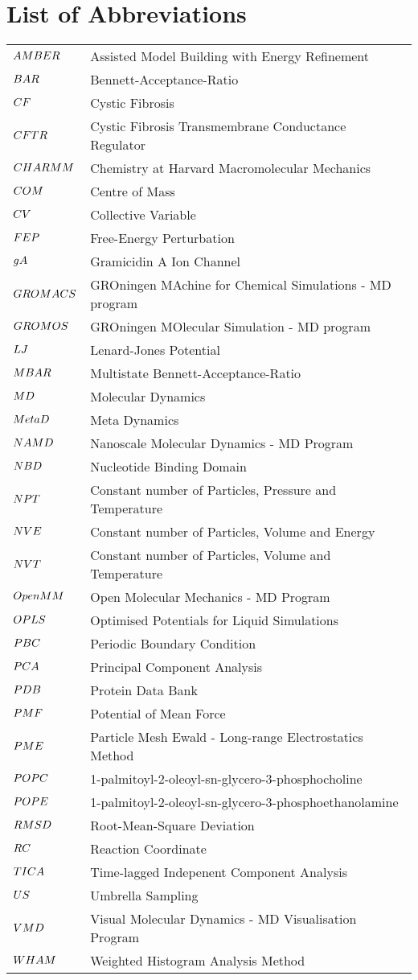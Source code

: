 \chapter*{List of Abbreviations}
\label{chap:abbrev}

\begin{center}
\begin{bfseries}
\vskip 5mm
\newcommand\nomenclature[2]{#1 & #2 \\}
\begin{longtable}{@{}p{3cm}@{}p{\dimexpr\textwidth-1cm\relax}@{}}
\nomenclature{${\small AMBER}$}    {Assisted Model Building with Energy Refinement}
\nomenclature{${\small BAR}$}      {Bennett-Acceptance-Ratio}
\nomenclature{${\small CF}$}        {Cystic Fibrosis}
\nomenclature{${\small CFTR}$}      {Cystic Fibrosis Transmembrane Conductance Regulator}
\nomenclature{${\small CHARMM}$}   {Chemistry at Harvard Macromolecular Mechanics}
\nomenclature{${\small COM}$}      {Centre of Mass}
\nomenclature{${\small CV}$}       {Collective Variable}
\nomenclature{${\small FEP}$}      {Free-Energy Perturbation}
\nomenclature{${\small gA}$}       {Gramicidin A Ion Channel}
\nomenclature{${\small GROMACS}$}  {GROningen MAchine for Chemical Simulations - MD program}
\nomenclature{${\small GROMOS}$}   {GROningen MOlecular Simulation - MD program}
\nomenclature{${\small LJ}$}       {Lenard-Jones Potential}
\nomenclature{${\small MBAR}$}     {Multistate Bennett-Acceptance-Ratio}
\nomenclature{${\small MD}$}       {Molecular Dynamics}
\nomenclature{${\small MetaD}$}    {Meta Dynamics}
\nomenclature{${\small NAMD}$}     {Nanoscale Molecular Dynamics - MD Program}
\nomenclature{${\small NBD}$}     {Nucleotide Binding Domain}
\nomenclature{${\small NPT}$}      {Constant number of Particles, Pressure and Temperature}
\nomenclature{${\small NVE}$}      {Constant number of Particles, Volume and Energy}
\nomenclature{${\small NVT}$}      {Constant number of Particles, Volume and Temperature}
\nomenclature{${\small OpenMM}$}   {Open Molecular Mechanics - MD Program}
\nomenclature{${\small OPLS}$}     {Optimised Potentials for Liquid Simulations}
\nomenclature{${\small PBC}$}      {Periodic Boundary Condition}
\nomenclature{${\small PCA}$}      {Principal Component Analysis}
\nomenclature{${\small PDB}$}      {Protein Data Bank}
\nomenclature{${\small PMF}$}      {Potential of Mean Force}
\nomenclature{${\small PME}$}      {Particle Mesh Ewald - Long-range Electrostatics Method}
\nomenclature{${\small POPC}$}     {1-palmitoyl-2-oleoyl-sn-glycero-3-phosphocholine}
\nomenclature{${\small POPE}$}     {1-palmitoyl-2-oleoyl-sn-glycero-3-phosphoethanolamine}
\nomenclature{${\small RMSD}$}     {Root-Mean-Square Deviation}
\nomenclature{${\small RC}$}       {Reaction Coordinate}
\nomenclature{${\small TICA}$}     {Time-lagged Indepenent Component Analysis}
\nomenclature{${\small US}$}       {Umbrella Sampling}
\nomenclature{${\small VMD}$}      {Visual Molecular Dynamics - MD Visualisation Program}
\nomenclature{${\small WHAM}$}     {Weighted Histogram Analysis Method}
\end{longtable}
\end{bfseries}
\end{center}

